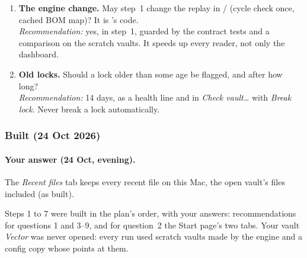 \begin{enumerate}
        hidden?\\
        \emph{Recommendation:} show top assemblies, labelled so. Hide the section when there are more than 12, because
        then the BOMs are not recorded yet and the list would mislead.
  \item \textbf{The engine change.} May step~1 change the replay in / (cycle check once,
        cached BOM map)? It is 's code.\\
        \emph{Recommendation:} yes, in step~1, guarded by the contract tests and a  comparison on the
        scratch vaults. It speeds up every reader, not only the dashboard.
  \item \textbf{Old locks.} Should a lock older than some age be flagged, and after how long?\\
        \emph{Recommendation:} 14 days, as a health line and in \emph{Check vault\ldots} with \emph{Break lock}. Never
        break a lock automatically.
\end{enumerate}

\subsubsection*{Built (24 Oct 2026)}\label{sec:pdm10-built}

\paragraph{Your answer (24 Oct, evening).} The \emph{Recent files} tab keeps every recent file on this Mac, the open vault's files included (as built).


Steps 1 to 7 were built in the plan's order, with your answers: recommendations for questions 1 and 3--9, and for
question~2 the Start page's two tabs. Your vault \emph{Vector} was never opened: every run used scratch vaults made
by the engine and a config copy whose  points at them.

